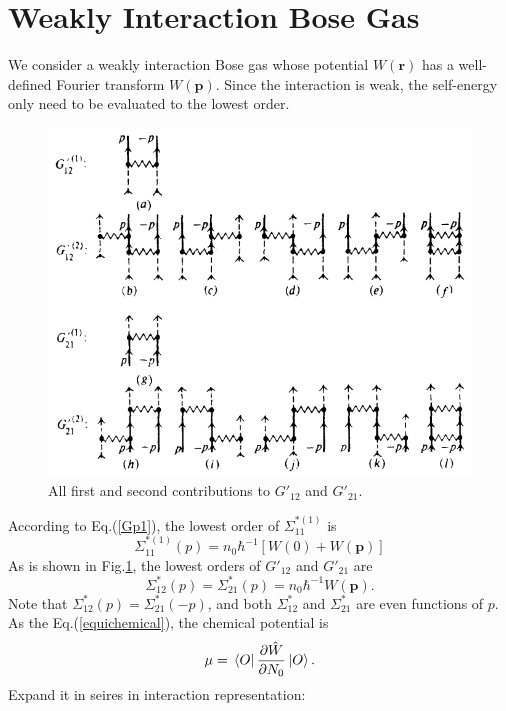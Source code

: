 \documentclass[12pt]{article}
\begin{document}
\section{Weakly Interaction Bose Gas}
We consider a weakly interaction Bose gas whose potential $W(\mathbf{r})$ has a 
well-defined Fourier transform $W(\mathbf{p})$. Since the interaction is weak, the 
self-energy only need to be evaluated to the lowest order. 
\begin{figure}[H]
    \centering
    \includegraphics[width=13cm]{p8.png}
    \renewcommand{\figurename}{Fig.}
    \caption{All first and second contributions to $G'_{12}$ and $G'_{21}$.}
    \label{img8}
\end{figure}
\noindent According to Eq.(\ref{Gp1}), the lowest order of $\Sigma^{*(1)}_{11}$ is 
\begin{equation}
    \Sigma^{*(1)}_{11}(p)=n_0\hbar^{-1}[W(0)+W(\mathbf{p})]
\end{equation}
As is shown in Fig.\ref{img8}, the lowest orders of $G'_{12}$ and $G'_{21}$ are 
\begin{equation}
    \Sigma_{12}^*(p)=\Sigma_{21}^*(p)=n_{0}\hbar^{-1}W(\mathbf{p}).
\end{equation}
Note that $\Sigma_{12}^*(p)=\Sigma_{21}^*(-p)$, and both $\Sigma_{12}^*$ and 
$\Sigma_{21}^*$ are even functions of $p$. As the Eq.(\ref{equichemical}), the 
chemical potential is 
\begin{equation*}
    \mu=\bra*{O}\frac{\partial \hat{W}}{\partial N_0}\ket*{O}.
\end{equation*}
Expand it in seires in interaction representation:
\end{document}
